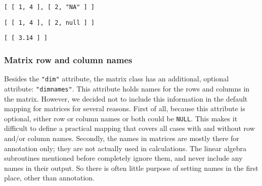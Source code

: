\begin{knitrout}\mycodesize
{}\color{fgcolor}\begin{kframe}
\begin{alltt}
 \hlkwb{<-} \hlstd{(}\hlstd{(}\hlstd{,} \hlstd{,} \hlstd{,} \hlstd{),}  \hlstd{=} \hlstd{)}
\hlstd{(}
\end{alltt}
\begin{verbatim}
[ [ 1, 4 ], [ 2, "NA" ] ]
\end{verbatim}
\begin{alltt}
\hlstd{(}  \hlstd{=} \hlstd{))}
\end{alltt}
\begin{verbatim}
[ [ 1, 4 ], [ 2, null ] ]
\end{verbatim}
\begin{alltt}
\hlstd{(}\hlstd{(}
\end{alltt}
\begin{verbatim}
[ [ 3.14 ] ]
\end{verbatim}
\end{kframe}
\end{knitrout}



\subsubsection{Matrix row and column names}

Besides the \texttt{"dim"} attribute, the matrix class has an additional, optional attribute: \texttt{"dimnames"}. This attribute holds names for the rows and columns in the matrix. However, we decided not to include this information in the default \JSON mapping for matrices for several reasons. First of all, because this attribute is optional, either row or column names or both could be \texttt{NULL}. This makes it difficult to define a practical mapping that covers all cases with and without row and/or column names. Secondly, the names in matrices are mostly there for annotation only; they are not actually used in calculations. The linear algebra subroutines mentioned before completely ignore them, and never include any names in their output. So there is often little purpose of setting names in the first place, other than annotation.

